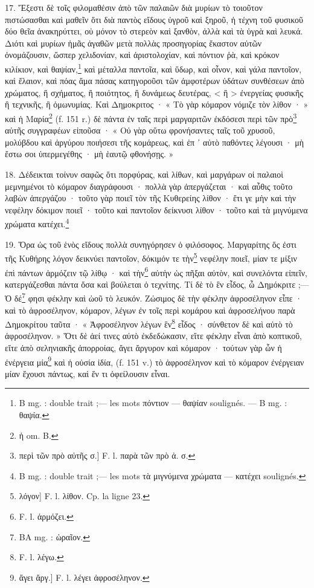 \documentclass[a4paper, 11pt, oneside, polutonikogreek, french]{article}
\begin{document}
17. Ἔξεστι δὲ τοῖς φιλομαθέσιν ἀπὸ τῶν παλαιῶν διὰ μυρίων τὸ τοιοῦτον πιστώσασθαι καὶ μαθεῖν ὅτι διὰ παντὸς εἴδους ὐγροῦ καὶ ξηροῦ, ἡ τέχνη τοῦ φυσικοῦ δύο θεῖα ἀνακηρύττει, οὐ μόνον τὸ στερεὸν καὶ ξανθὸν, ἀλλὰ καὶ τὰ ὑγρὰ καὶ λευκά. Διότι καὶ μυρίων ἡμᾶς ἀγαθῶν μετὰ πολλὰς προσηγορίας ἕκαστον αὐτῶν ὀνομάζουσιν, ὥσπερ χελιδονίαν, καὶ ἀριστολοχίαν, καὶ πόντιον ῥὰ, καὶ κρόκον κιλίκιον, καὶ θαψίαν,\footnote{B mg. : double trait ;--- les mots πόντιον --- θαψίαν soulignés. --- B mg. : θαψία.} καὶ μέταλλα παντοῖα, καὶ ὕδωρ, καὶ οἶνον, καὶ γάλα παντοῖον, καὶ ἔλαιον, καὶ πόας ἅμα πάσας κατηγοροῦσι τῶν ἀμφοτέρων ὑδάτων συνθέσεων ἀπὸ χρώματος, ἢ σχήματος, ἢ ποιότητος, ἢ δυνάμεως δευτέρας, < ἢ > ἐνεργείας φυσικῆς ἢ τεχνικῆς, ἢ ὁμωνυμίας. Καὶ Δημοκριτος · « Τὸ γὰρ κόμαρον νόμιζε τὸν λίθον · » καὶ ἡ Μαρία\footnote{ἡ om. B.} (f. 151 r.) δὲ πάντα ἐν ταῖς περὶ μαργαριτῶν ἐκδόσεσι περὶ τῶν πρὸ\footnote{περὶ τῶν πρὸ αὐτῆς σ.] F. l. παρὰ τῶν πρὸ ἀ. σ.} αὐτῆς συγγραφέων εἰποῦσα · « Οὐ γὰρ οὕτω φρονήσαντες ταῖς τοῦ χρυσοῦ, μολύβδου καὶ ἀργύρου ποιήσεσι τῆς κομάρεως, καὶ ἐπ ᾽ αὐτὸ παθόντες λέγουσι · μὴ ἔστω σοι ὑπερμεγέθης · μὴ ἑαυτῷ φθονήσῃς. »

18. Δέδεικται τοίνυν σαφῶς ὅτι πορφύρας, καὶ λίθων, καὶ μαργάρων οἱ παλαιοὶ μεμνημένοι τὸ κόμαρον διαγράφουσι · πολλὰ γὰρ ἀπεργάζεται · καὶ αὖθις τοῦτο λαβὼν ἀπεργάζου · τοῦτο γὰρ ποιεῖ τὸν τῆς Κυθερείης λίθον · ἔτι γε μὴν καὶ τὴν νεφέλην δόκιμον ποιεῖ · τοῦτο καὶ παντοῖον δείκνυσι λίθον · τοῦτο καὶ τὰ μιγνύμενα χρώματα κατέχει.\footnote{B mg. : double trait ;--- les mots τὰ μιγνύμενα χρώματα --- κατέχει soulignés.}

19. Ὅρα ὡς τοῦ ἑνὸς εἴδους πολλὰ συνηγόρησεν ὁ φιλόσοφος. Μαργαρίτης ὅς ἐστι τῆς Κυθήρης λόγον δεικνύει παντοῖον, δόκιμόν τε τὴν\footnote{λόγον] F. l. λίθον. Cp. la ligne 23.} νεφέλην ποιεῖ, μίαν τε μίξιν ἐπὶ πάντων ἁρμόζειν τῷ λίθῳ · καὶ τὴν\footnote{F. l. ἁρμόζει.} αὐτὴν ὡς πῆξαι αὐτὸν, καὶ συνελόντα εἰπεῖν, κατεργάζεσθαι πάντα ὅσα καὶ βούλεται ὁ τεχνίτης. Τί δὲ τὸ ἓν εἶδος, ὦ Δημόκριτε ;--- Ὁ δέ\footnote{BA mg. : ὡραῖον.} φησι φέκλην καὶ ὠοῦ τὸ λευκόν. Ζώσιμος δὲ τὴν φέκλην ἀφροσέληνον εἶπε · καὶ τὸ ἀφροσέληνον, κόμαρον, λέγων ἐν τοῖς περὶ κομάρου καὶ ἀφροσελήνου παρὰ Δημοκρίτου ταῦτα · « Ἀφροσέληνον λέγων ἓν\footnote{F. l. λέγω.} εἶδος · σύνθετον δὲ καὶ αὐτὸ τὸ ἀφροσέληνον. » Ὅτι δὲ ἀεί τινες αὐτὸ ἐκδεδώκασιν, εἴτε φέκλην εἶναι ἀπὸ κοπτικοῦ, εἴτε ἀπὸ σεληνιακῆς ἀπορροίας, ἄγει ἄργυρον καὶ κόμαρον · τούτων γὰρ ὧν ἡ ἐνέργεια μία\footnote{ἄγει ἄργ.] F. l. λέγει ἀφροσέληνον.} καὶ ἡ οὐσία ἰδία, (f. 151 v.) τὸ ἀφροσέληνον καὶ τὸ κόμαρον ἐνέργειαν μίαν ἔχουσι πάντως, καὶ ἕν τι ὀφείλουσιν εἶναι.
\end{document}
